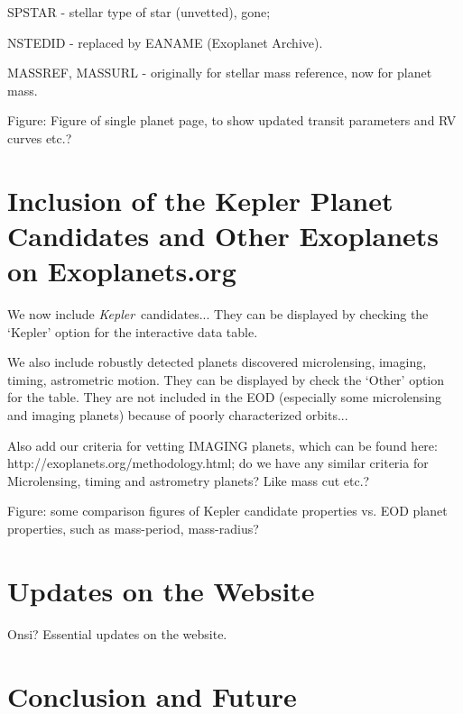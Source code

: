 \documentclass[11pt,preprint]{aastex}
\def\kepler{\textit{Kepler}}
\begin{document}
\begin{CJK*}{UTF8}{gbsn}
SPSTAR - stellar type of star (unvetted), gone;

NSTEDID - replaced by EANAME (Exoplanet Archive).

MASSREF, MASSURL - originally for stellar mass reference, now for planet mass.

Figure: Figure of single planet page, to show updated transit
parameters and RV curves etc.?


\section{Inclusion of the Kepler Planet Candidates and Other Exoplanets on Exoplanets.org}\label{sec:kepler}

We now include \kepler\ candidates... They can be displayed by
checking the `Kepler' option for the interactive data table.

We also include robustly detected planets discovered microlensing,
imaging, timing, astrometric motion. They can be displayed by check
the `Other' option for the table. They are not included in the EOD
(especially some microlensing and imaging planets) because of poorly
characterized orbits...

Also add our criteria for vetting IMAGING planets, which can be found
here: http://exoplanets.org/methodology.html; do we have any similar
criteria for Microlensing, timing and astrometry planets? Like mass
cut etc.?

Figure: some comparison figures of Kepler candidate properties
vs. EOD planet properties, such as mass-period, mass-radius?


\section{Updates on the Website}

Onsi? Essential updates on the website.


\section{Conclusion and Future}\label{sec:conclusion}


\end{CJK*}
\end{document}
